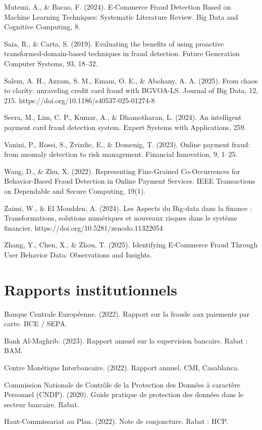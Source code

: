Mutemi, A., \& Bacao, F. (2024). E-Commerce Fraud Detection Based on Machine Learning Techniques: Systematic Literature Review. Big Data and Cognitive Computing, 8.

Saia, R., \& Carta, S. (2019). Evaluating the benefits of using proactive transformed-domain-based techniques in fraud detection. Future Generation Computer Systems, 93, 18–32.

Salem, A. H., Azzam, S. M., Emam, O. E., \& Abohany, A. A. (2025). From chaos to clarity: unraveling credit card fraud with BGVOA-LS. Journal of Big Data, 12, 215. https://doi.org/10.1186/s40537-025-01274-8

Seera, M., Lim, C. P., Kumar, A., \& Dhamotharan, L. (2024). An intelligent payment card fraud detection system. Expert Systems with Applications, 259.

Vanini, P., Rossi, S., Zvizdic, E., \& Domenig, T. (2023). Online payment fraud: from anomaly detection to risk management. Financial Innovation, 9, 1–25.

Wang, D., \& Zhu, X. (2022). Representing Fine-Grained Co-Occurrences for Behavior-Based Fraud Detection in Online Payment Services. IEEE Transactions on Dependable and Secure Computing, 19(1).

Zaimi, W., \& El Moudden, A. (2024). Les Aspects du Big-data dans la finance : Transformations, solutions numériques et nouveaux risques dans le système financier. https://doi.org/10.5281/zenodo.11322054

Zhang, Y., Chen, X., \& Zhou, T. (2025). Identifying E-Commerce Fraud Through User Behavior Data: Observations and Insights.

\section{Rapports institutionnels}

Banque Centrale Européenne. (2022). Rapport sur la fraude aux paiements par carte. BCE / SEPA.

Bank Al-Maghrib. (2023). Rapport annuel sur la supervision bancaire. Rabat : BAM.

Centre Monétique Interbancaire. (2022). Rapport annuel. CMI, Casablanca.

Commission Nationale de Contrôle de la Protection des Données à caractère Personnel (CNDP). (2020). Guide pratique de protection des données dans le secteur bancaire. Rabat.

Haut-Commissariat au Plan. (2022). Note de conjoncture. Rabat : HCP.

